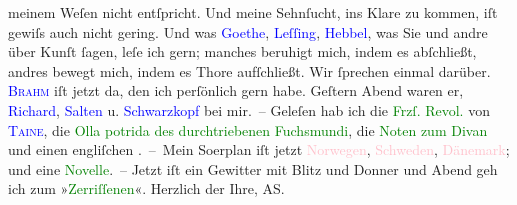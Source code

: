                     meinem Weſen nicht entſpricht. Und meine Sehnſucht, ins Klare zu kommen, iſt
                    gewiſs auch nicht gering. Und was \textcolor{blue}{Goethe}{}\ledrightnote{\textcolor{blue}{Johann Wolfgang von Goethe}},
                        \textcolor{blue}{Leſſing}{}\ledrightnote{\textcolor{blue}{Gotthold Ephraim Lessing}}, \textcolor{blue}{Hebbel}{}\ledrightnote{\textcolor{blue}{Friedrich Hebbel}}, was Sie und andre über Kunſt ſagen, leſe ich gern; manches
                    beruhigt mich, indem es abſchließt, andres bewegt {\pb}mich, indem es Thore aufſchließt. Wir ſprechen einmal darüber.\pend
           \pstart
           \textcolor{blue}{\textsc{Brahm}}{}\ledrightnote{\textcolor{blue}{Otto Brahm}} iſt jetzt da, den ich perſönlich gern
                    habe. Geſtern Abend waren er, \textcolor{blue}{Richard}{}\ledrightnote{\textcolor{blue}{Richard Beer-Hofmann}}, \textcolor{blue}{Salten}{}\ledrightnote{\textcolor{blue}{Felix Salten}} u. \textcolor{blue}{Schwarzkopf}{}\ledrightnote{\textcolor{blue}{Gustav Schwarzkopf}} bei mir. – Geleſen hab ich die \textcolor{green}{Frzſ. Revol.}{}\ledrightnote{\textcolor{green}{Die Revolution}} von \textcolor{blue}{\textsc{Taine}}{}\ledrightnote{\textcolor{blue}{Hippolyte Taine}}, die \textcolor{green}{Olla potrida des durchtriebenen
                        Fuchsmundi}{}\ledrightnote{\textcolor{green}{Ollapatrida des durchgetriebenen Fuchsmundi}}, die \textcolor{green}{Noten zum Divan}{}\ledrightnote{\textcolor{green}{West-östlicher Divan}} und
                    einen engliſchen \label{K_L00546_1v}\label{K_L00546_1h}. – Mein
               So{\geminationm}erplan iſt jetzt \textcolor{pink}{Norwegen}{}\ledrightnote{\textcolor{pink}{Norwegen}}, \textcolor{pink}{Schweden}{}\ledrightnote{\textcolor{pink}{Schweden}}, \textcolor{pink}{Dänemark}{}\ledrightnote{\textcolor{pink}{Dänemark}}; und eine \textcolor{green}{Novelle}{}. – Jetzt iſt ein Gewitter mit
                    Blitz und Donner und Abend geh ich zum »\textcolor{green}{Zerriſſenen}{}\ledrightnote{\textcolor{green}{Der Zerrissene}}«.\pend
           \pstart Herzlich der Ihre, \spacefill\mbox{AS.}\pend{}\endnumbering{}  
      